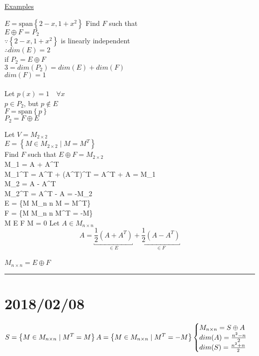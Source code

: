 \documentclass[12pt]{article}
\newcommand{\uu}[1]{\underbracket{#1}}
\newenvironment{examples}{\shownto{-,compact}\underline{Examples}\enumerate}{\endenumerate\divider\endshownto}
\newcommand{\bb}[1]{\left\{#1\right\}}
\newcommand{\pp}[1]{\left(#1\right)}
\newcommand{\divider}[0]{\par\textcolor{lightgray}{\rule{\textwidth}{0.1pt}}}
\newcommand{\sspan}[1]{\text{span}\bb{#1}}
\newenvironment{eqn}{\equation\alignedat{3}}{\endalignedat\endequation}
\begin{document}
	\begin{examples}
		\item $E = \sspan{2 - x, 1 + x^2}$ \qquad Find $F$ such that \\
		$E \oplus F = P_2$ \\
		$\because \bb{2 - x, 1 + x^2}$ is linearly independent \\
		$\therefore dim(E) = 2$ \\
		if $P_2 = E \oplus F$ \\ 
		$3 = dim(P_2) = dim(E) + dim(F)$ \\
		$dim(F) = 1$ \\\\
		Let $p(x) = 1 \quad \forall x$ \\
		$p \in P_2$, but $p \notin E$ \\
		$F = \sspan{p}$ \\
		$P_2 = F \oplus E$
		
		\item Let $V = M_{2 \times 2}$ \\
		$E = \bb{M \in M_{2 \times 2} \mid M = M^T}$ \\
		Find $F$ such that $E \oplus F = M_{2 \times 2}$ \\
		
		\begin{eqn}
			M_1 = A + A^T \\
			M_1^T = A^T + \pp{A^T}^T = A^T + A = M_1 \\
			M_2 = A - A^T \\
			M_2^T = A^T - A = -M_2 \\
			E = \bb{M \in M_{n \times n} \mid M = M^T} \\
			F = \bb{M \in M_{n \times n} \mid M^T = -M} \\
			M \in E \cap F \Rightarrow M = 0 
		\end{eqn}
		Let $A \in M_{n \times n}$ \\
		$$A = \uu{\frac{1}{2} (A + A^T)}_{\in E} + \uu{\frac{1}{2} (A - A^T)}_{\in F}$$ \\
		$M_{n \times n} = E \oplus F$
	\end{examples}
	
	
	\section{2018/02/08}
	
	\begin{equation}
	S = \bb{M \in M_{n \times n} \mid M^T = M} \\
	A = \bb{M \in M_{n \times n} \mid M^T = -M}
	\begin{cases}
	M_{n \times n} = S \oplus A \\
	dim(A) = \frac{n^2 - n}{2} \\
	dim(S) = \frac{n^2 + n}{2}
	\end{cases}
	\end{equation}
	
\end{document}
